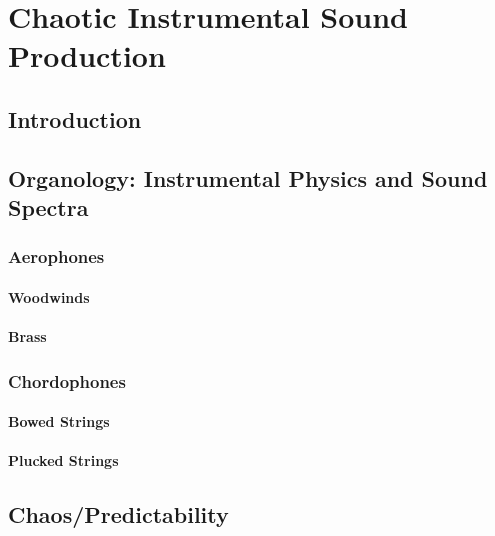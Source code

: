 \chapter{Chaotic Instrumental Sound Production}
\section{Introduction}

\section{Organology: Instrumental Physics and Sound Spectra}
\subsection{Aerophones}
\subsubsection{Woodwinds}
\subsubsection{Brass}
\subsection{Chordophones}
\subsubsection{Bowed Strings}
\subsubsection{Plucked Strings}
\section{Chaos/Predictability}
